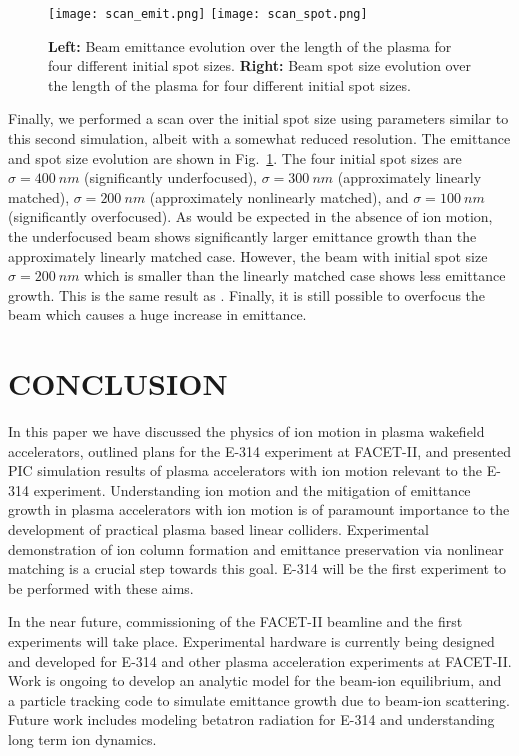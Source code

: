 \documentclass{aac}
\begin{document}
\begin{figure}[h]
    \centering
    \texttt{[image: scan\_emit.png]}
    \texttt{[image: scan\_spot.png]}
    \centering
    \caption{\textbf{Left:} Beam emittance evolution over the length of the plasma for four different initial spot sizes. \textbf{Right:} Beam spot size evolution over the length of the plasma for four different initial spot sizes.}
    \label{fig:scan}
\end{figure}

Finally, we performed a scan over the initial spot size using parameters similar to this second simulation, albeit with a somewhat reduced resolution. The emittance and spot size evolution are shown in Fig.~\ref{fig:scan}. The four initial spot sizes are $\sigma = \SI{400}{nm}$ (significantly underfocused), $\sigma = \SI{300}{nm}$ (approximately linearly matched), $\sigma = \SI{200}{nm}$ (approximately nonlinearly matched), and $\sigma = \SI{100}{nm}$ (significantly overfocused). As would be expected in the absence of ion motion, the underfocused beam shows significantly larger emittance growth than the approximately linearly matched case. However, the beam with initial spot size $\sigma = \SI{200}{nm}$ which is smaller than the linearly matched case shows less emittance growth. This is the same result as \cite{an}. Finally, it is still possible to overfocus the beam which causes a huge increase in emittance.

\section{CONCLUSION}

In this paper we have discussed the physics of ion motion in plasma wakefield accelerators, outlined plans for the E-314 experiment at FACET-II, and presented PIC simulation results of plasma accelerators with ion motion relevant to the E-314 experiment. Understanding ion motion and the mitigation of emittance growth in plasma accelerators with ion motion is of paramount importance to the development of practical plasma based linear colliders. Experimental demonstration of ion column formation and emittance preservation via nonlinear matching is a crucial step towards this goal. E-314 will be the first experiment to be performed with these aims.

In the near future, commissioning of the FACET-II beamline and the first experiments will take place. Experimental hardware is currently being designed and developed for E-314 and other plasma acceleration experiments at FACET-II. Work is ongoing to develop an analytic model for the beam-ion equilibrium, and a particle tracking code to simulate emittance growth due to beam-ion scattering. Future work includes modeling betatron radiation for E-314 and understanding long term ion dynamics.
\end{document}
